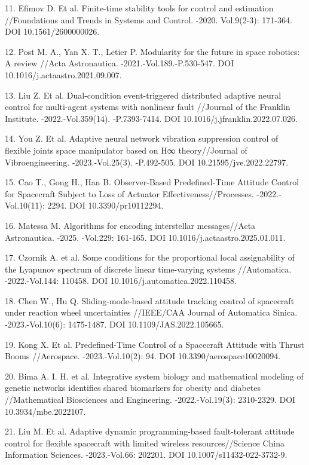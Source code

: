 \begin{refs}
11. Efimov D. Et al. Finite-time stability tools for control and
estimation //Foundations and Trends in Systems and Control. -2020.
Vol.9(2-3): 171-364. DOI 10.1561/2600000026.

12. Post M. A., Yan X. T., Letier P. Modularity for the future in space
robotics: A review //Acta Astronautica. -2021.-Vol.189.-P.530-547. DOI
10.1016/j.actaastro.2021.09.007.

13. Liu Z. Et al. Dual-condition event-triggered distributed adaptive
neural control for multi-agent systems with nonlinear fault //Journal of
the Franklin Institute. -2022.-Vol.359(14). -P.7393-7414. DOI
10.1016/j.jfranklin.2022.07.026.

14. You Z. Et al. Adaptive neural network vibration suppression control
of flexible joints space manipulator based on H∞ theory//Journal of
Vibroengineering. -2023.-Vol.25(3). -P.492-505. DOI
10.21595/jve.2022.22797.

15. Cao T., Gong H., Han B. Observer-Based Predefined-Time Attitude
Control for Spacecraft Subject to Loss of Actuator
Effectiveness//Processes. -2022.-Vol.10(11): 2294. DOI
10.3390/pr10112294.

16. Matessa M. Algorithms for encoding interstellar messages//Acta
Astronautica. -2025. -Vol.229: 161-165. DOI
10.1016/j.actaastro.2025.01.011.

17. Czornik A. et al. Some conditions for the proportional local
assignability of the Lyapunov spectrum of discrete linear time-varying
systems //Automatica. -2022.-Vol.144: 110458. DOI
10.1016/j.automatica.2022.110458.

18. Chen W., Hu Q. Sliding-mode-based attitude tracking control of
spacecraft under reaction wheel uncertainties //IEEE/CAA Journal of
Automatica Sinica. -2023.-Vol.10(6): 1475-1487. DOI
10.1109/JAS.2022.105665.

19. Kong X. Et al. Predefined-Time Control of a Spacecraft Attitude with
Thrust Booms //Aerospace. -2023.-Vol.10(2): 94. DOI
10.3390/aerospace10020094.

20. Bima A. I. H. et al. Integrative system biology and mathematical
modeling of genetic networks identifies shared biomarkers for obesity
and diabetes //Mathematical Biosciences and Engineering.
-2022.-Vol.19(3): 2310-2329. DOI 10.3934/mbe.2022107.

21. Liu M. Et al. Adaptive dynamic programming-based fault-tolerant
attitude control for flexible spacecraft with limited wireless
resources//Science China Information Sciences. -2023.-Vol.66: 202201.
DOI 10.1007/s11432-022-3732-9.


\end{refs}
